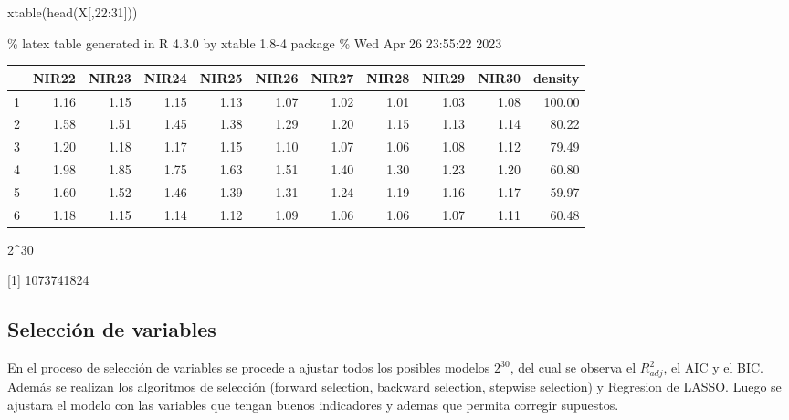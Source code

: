 \documentclass[
]{article}
\newenvironment{Shaded}{\begin{snugshade}}{\end{snugshade}}
\newcommand{\DecValTok}[1]{\textcolor[rgb]{0.00,0.00,0.81}{#1}}
\newcommand{\FunctionTok}[1]{\textcolor[rgb]{0.00,0.00,0.00}{#1}}
\newcommand{\NormalTok}[1]{#1}
\newcommand{\SpecialCharTok}[1]{\textcolor[rgb]{0.00,0.00,0.00}{#1}}
\begin{document}
\begin{Shaded}
\begin{Highlighting}[]
\FunctionTok{xtable}\NormalTok{(}\FunctionTok{head}\NormalTok{(X[,}\DecValTok{22}\SpecialCharTok{:}\DecValTok{31}\NormalTok{]))}
\end{Highlighting}
\end{Shaded}

\% latex table generated in R 4.3.0 by xtable 1.8-4 package \% Wed Apr
26 23:55:22 2023

\begin{table}[ht]
\centering
\begin{tabular}{rrrrrrrrrrr}
  \hline
 & NIR22 & NIR23 & NIR24 & NIR25 & NIR26 & NIR27 & NIR28 & NIR29 & NIR30 & density \\ 
  \hline
1 & 1.16 & 1.15 & 1.15 & 1.13 & 1.07 & 1.02 & 1.01 & 1.03 & 1.08 & 100.00 \\ 
  2 & 1.58 & 1.51 & 1.45 & 1.38 & 1.29 & 1.20 & 1.15 & 1.13 & 1.14 & 80.22 \\ 
  3 & 1.20 & 1.18 & 1.17 & 1.15 & 1.10 & 1.07 & 1.06 & 1.08 & 1.12 & 79.49 \\ 
  4 & 1.98 & 1.85 & 1.75 & 1.63 & 1.51 & 1.40 & 1.30 & 1.23 & 1.20 & 60.80 \\ 
  5 & 1.60 & 1.52 & 1.46 & 1.39 & 1.31 & 1.24 & 1.19 & 1.16 & 1.17 & 59.97 \\ 
  6 & 1.18 & 1.15 & 1.14 & 1.12 & 1.09 & 1.06 & 1.06 & 1.07 & 1.11 & 60.48 \\ 
   \hline
\end{tabular}
\end{table}

\begin{Shaded}
\begin{Highlighting}[]
\DecValTok{2}\SpecialCharTok{\^{}}\DecValTok{30}
\end{Highlighting}
\end{Shaded}

{[}1{]} 1073741824

\hypertarget{selecciuxf3n-de-variables}{%
\subsection{Selección de variables}\label{selecciuxf3n-de-variables}}

En el proceso de selección de variables se procede a ajustar todos los
posibles modelos \(2^{30}\), del cual se observa el \(R^2_{adj}\), el
AIC y el BIC. Además se realizan los algoritmos de selección (forward
selection, backward selection, stepwise selection) y Regresion de LASSO.
Luego se ajustara el modelo con las variables que tengan buenos
indicadores y ademas que permita corregir supuestos.
\end{document}
